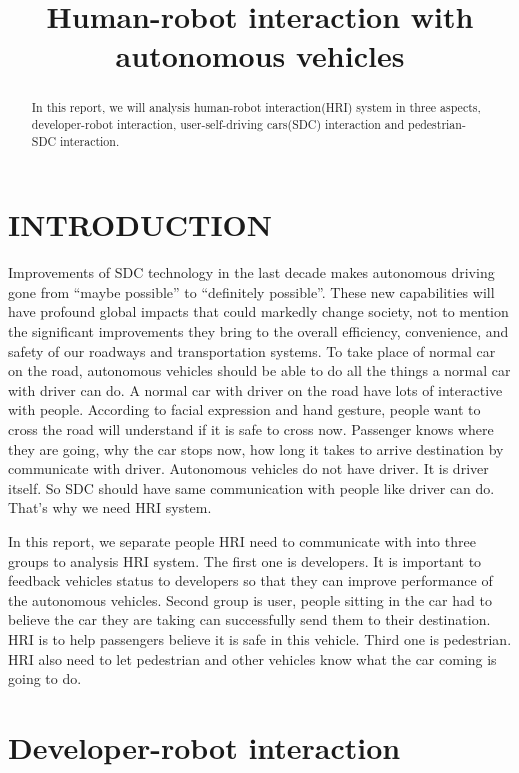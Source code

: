 \documentclass[a4paper, 10pt, conference]{ieeeconf}      %
\title{\LARGE \bf
Human-robot interaction with autonomous vehicles
}
\begin{document}
\maketitle
\thispagestyle{empty}
\pagestyle{empty}


\begin{abstract}
In this report, we will analysis human-robot interaction(HRI) system in three aspects, developer-robot interaction, user-self-driving cars(SDC) interaction and pedestrian-SDC interaction. 
\end{abstract}


\section{INTRODUCTION}
Improvements of SDC technology in the last decade makes autonomous driving gone from “maybe possible” to “definitely possible”. These new capabilities will have profound global impacts that could markedly change society, not to mention the significant improvements they bring to the overall efficiency, convenience, and safety of our roadways and transportation systems\cite{sdc}. To take place of normal car on the road, autonomous vehicles should be able to do all the things a normal car with driver can do. A normal car with driver on the road have lots of interactive with people. According to facial expression and hand gesture, people want to cross the road will understand if it is safe to cross now. Passenger knows where they are going, why the car stops now, how long it takes to arrive destination by communicate with driver. Autonomous vehicles do not have driver. It is driver itself. So SDC should have same communication with people like driver can do. That’s why we need HRI system.

In this report, we separate people HRI need to communicate with into three groups to analysis HRI system. The first one is developers. It is important to feedback vehicles status to developers so that they can improve performance of the autonomous vehicles. Second group is user, people sitting in the car had to believe the car they are taking can successfully send them to their destination. HRI is to help passengers believe it is safe in this vehicle. Third one is pedestrian. HRI also need to let pedestrian and other vehicles know what the car coming is going to do.

\section{Developer-robot interaction}
\end{document}
